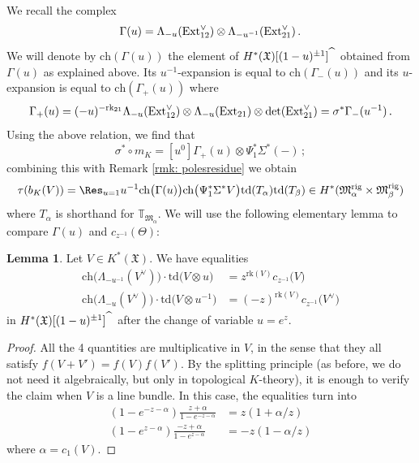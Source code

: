 \documentclass[12pt]{amsart}
\theoremstyle{definition}
\newtheorem{lemma}[definition]{Lemma}
\newcommand{\BT}{{\mathbb{T}}}
\newcommand{\1}{\mathbf 1}
\newcommand{\FM}{{\mathfrak{M}}}
\newcommand{\FX}{{\mathfrak{X}}}
\newcommand{\Ext}{\mathcal{E}\text{xt}}
\newcommand{\ch}{\mathrm{ch}}
\newcommand{\td}{\mathrm{td}}
\newcommand{\rk}{\mathrm{rk}}
\newcommand{\rig}{\mathrm{rig}}
\renewcommand{\Ext}{\textup{Ext}}
\begin{document}
We recall the complex
\[\Gamma(u)=\Lambda_{-u}(\Ext_{12}^\vee)\otimes \Lambda_{-u^{-1}}(\Ext_{21}^\vee)\,.\]
We will denote by $\ch(\Gamma(u))$ the element of $H^\ast(\FX)[(1-u)^{\pm 1}]^{\widehat{\hspace{0.2cm}}}$ obtained from $\Gamma(u)$ as explained above. Its $u^{-1}$-expansion is equal to $\ch(\Gamma_-(u))$ and its $u$-expansion is equal to $\ch(\Gamma_+(u))$ where
\[\Gamma_+(u)=(-u)^{-\rk_{21}}\Lambda_{-u}(\Ext_{12}^\vee)\otimes \Lambda_{-u}(\Ext_{21})\otimes \det(\Ext_{21}^\vee)=\sigma^\ast \Gamma_-(u^{-1})\,.\]
Using the above relation, we find that
\[\sigma^\ast \circ m_K=[u^0]\Gamma_+(u)\otimes \Psi_1^\ast \Sigma^\ast(-)\,;\]
combining this with Remark \ref{rmk: polesresidue} we obtain
\[\tau(b_K(V))=\Res_{u=1} u^{-1}  \ch\big(\Gamma(u)\big)\ch\big(\Psi_1^\ast \Sigma^\ast V\big)\td(T_{\alpha})\td(T_\beta) \in H^\ast(\FM^\rig_\alpha\times \FM^\rig_\beta)\]
where $T_\alpha$ is shorthand for $\BT_{\FM_\alpha}$. We will use the following elementary lemma to compare $\Gamma(u)$ and $c_{z^{-1}}(\Theta)$:
\begin{lemma}\label{lem: KtoH}
Let $V\in K^\ast(\FX)$. 
We have equalities
\begin{align*}
\ch\big(\Lambda_{-u^{-1}}(V^\vee) \big)\cdot \td\big(V\otimes u\big)&=z^{\rk(V)}c_{z^{-1}}\big(V\big)\\
\ch\big(\Lambda_{-u}(V^\vee) \big)\cdot \td\big(V\otimes u^{-1}\big)&=(-z)^{\rk(V)}c_{z^{-1}}\big(V^\vee\big)
\end{align*}
in $H^\ast(\FX)[(1-u)^{\pm 1}]^{\widehat{\hspace{0.2cm}}}$ after the change of variable $u=e^z$.
\end{lemma}
\begin{proof}
All the 4 quantities are multiplicative in $V$, in the sense that they all satisfy $f(V+V')=f(V)f(V')$. By the splitting principle (as before, we do not need it algebraically, but only in topological $K$-theory), it is enough to verify the claim when $V$ is a line bundle. In this case, the equalities turn into
\begin{align*}
(1-e^{-z-\alpha})\frac{z+\alpha}{1-e^{-z-\alpha}}&=z(1+\alpha/z)\\
(1-e^{z-\alpha})\frac{-z+\alpha}{1-e^{z-\alpha}}&=-z(1-\alpha/z)
\end{align*}
where $\alpha=c_1(V)$.\qedhere
\end{proof}
\end{document}
